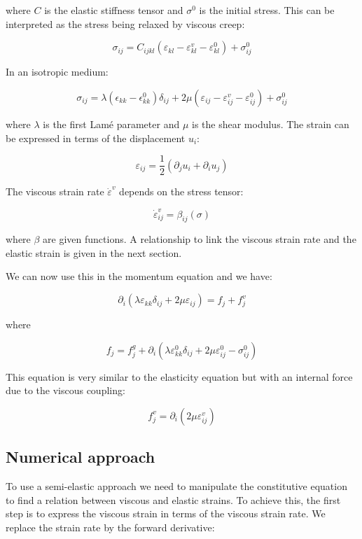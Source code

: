 where $ C $ is the elastic stiffness tensor and $ \sigma^0 $ is the initial stress. This can be interpreted as the stress being relaxed by viscous creep\-:

\[ \sigma_{ij} = C_{ijkl} \left( \varepsilon_{kl} - \varepsilon^v_{kl} -\varepsilon^0_{kl} \right) + \sigma^0_{ij} \]

In an isotropic medium\-:

\[ \sigma_{ij} = \lambda \left( \epsilon_{kk} - \epsilon^0_{kk} \right) \delta_{ij} + 2\mu \left( \varepsilon_{ij} - \varepsilon^v_{ij} - \varepsilon^0_{ij} \right) + \sigma^0_{ij} \]

where $ \lambda $ is the first Lamé parameter and $\mu$ is the shear modulus. The strain can be expressed in terms of the displacement $ u_i $\-:

\[ \varepsilon_{ij} = \frac{1}{2} \left( \partial_j u_i + \partial_i u_j \right) \]

The viscous strain rate $ \dot \varepsilon^v $ depends on the stress tensor\-:

\[ \dot \varepsilon^v_{ij} = \beta_{ij}(\sigma) \]

where $ \beta $ are given functions. A relationship to link the viscous strain rate and the elastic strain is given in the next section.

We can now use this in the momentum equation and we have\-:

\[ \partial_i \left( \lambda \varepsilon_{kk} \delta_{ij} + 2 \mu \varepsilon_{ij} \right) = f_j + f^v_j \]

where

\[ f_j = f^g_j + \partial_i \left( \lambda \varepsilon^0_{kk}\delta_{ij} + 2 \mu \varepsilon^0_{ij} - \sigma^0_{ij} \right) \]

This equation is very similar to the elasticity equation but with an internal force due to the viscous coupling\-:

\[ f^v_j = \partial_i \left( 2 \mu \varepsilon^v_{ij} \right) \]\hypertarget{index_num_approach}{}\subsection{Numerical approach}\label{index_num_approach}
To use a semi-\/elastic approach we need to manipulate the constitutive equation to find a relation between viscous and elastic strains. To achieve this, the first step is to express the viscous strain in terms of the viscous strain rate. We replace the strain rate by the forward derivative\-:

